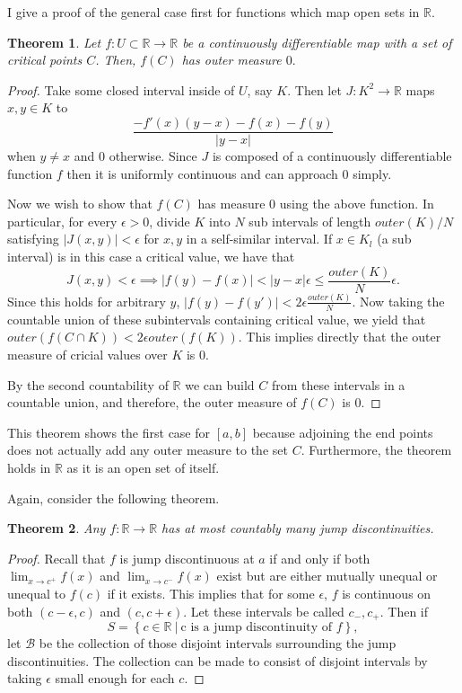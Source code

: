 \documentclass[letter]{article}
\newtheorem{theorem}{Theorem}
\newenvironment{menumerate}{%
  \edef\backupindent{\the\parindent}%
  \enumerate%
  \setlength{\parindent}{\backupindent}%
}{\endenumerate}
\begin{document}
\begin{menumerate}
\setcounter{enumi}{33}
\item I give a proof of the general case first for functions which map open sets in $\mathbb{R}.$
	\begin{theorem}
		Let $f:U \subset \mathbb{R} \to \mathbb{R}$ be a continuously differentiable map with a set of critical points $C$. Then, $f(C)$ has outer measure $0.$
	\end{theorem}
	\begin{proof}
		Take some closed interval inside of $U$, say $K.$ Then let $J:K^2 \to \mathbb{R}$ maps $x,y \in K$ to $$\frac{-f'(x)(y-x) - f(x) -f(y)}{|y-x|}$$ when $y\neq x$ and $0$ otherwise. Since $J$ is composed of a continuously differentiable function $f$ then it is uniformly continuous and can approach $0$ simply. 

		Now we wish to show that $f(C)$ has measure $0$ using the above function. In particular, for every $\epsilon > 0$, divide $K$ into $N$ sub intervals of length $outer(K)/N$ satisfying $|J(x,y)| < \epsilon$ for $x,y$ in a self-similar interval. If $x \in K_l$ (a sub interval) is in this case a critical value, we have that $$J(x,y) < \epsilon \implies |f(y)-f(x)| < |y-x|\epsilon \leq  \frac{outer(K)}{N}\epsilon.$$
		Since this holds for arbitrary $y$, $|f(y) - f(y')| < 2\epsilon  \frac{outer(K)}{N}.$ Now taking the countable union of these subintervals containing critical value, we yield that $outer(f(C \cap K)) < 2\epsilon outer (f(K))$. This implies directly that the outer measure of cricial values over $K$ is 0. 

		By the second countability of $\mathbb{R}$ we can build $C$ from these intervals in a countable union, and therefore, the outer measure of $f(C)$ is $0$.
	\end{proof}

	This theorem shows the first case for $[a,b]$ because adjoining the end points does not actually add any outer measure to the set $C.$ Furthermore, the theorem holds in $\mathbb{R}$ as it is an open set of itself.

\setcounter{enumi}{35}
\item Again, consider the following theorem.
	\begin{theorem}
		Any $f: \mathbb{R} \to \mathbb{R}$ has at most countably many jump discontinuities.
	\end{theorem}
	\begin{proof}
		Recall that $f$ is jump discontinuous at $a$ if and only if both $\lim_{x\to c^+} f(x)$ and $\lim_{x \to c^-} f(x)$ exist but are either mutually unequal or unequal to $f(c)$ if it exists. This implies that for some $\epsilon$, $f$ is continuous on both $(c-\epsilon,c)$ and $(c,c+\epsilon)$. Let these intervals be called $c_-, c_+.$ Then if $$S = \left\{c \in \mathbb{R} \ | \ \text{c is a jump discontinuity of }f\right\},$$ let $\mathcal{B}$ be the collection of those disjoint intervals surrounding the jump discontinuities. The collection can be made to consist of disjoint intervals by taking $\epsilon$ small enough for each $c.$


\end{proof}
\end{menumerate}
\end{document}
